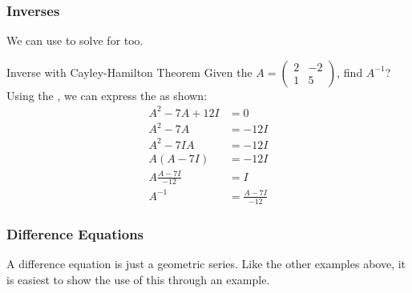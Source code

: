 \subsubsection{Inverses}\label{subsubsec:Cayley-Hamilton_Inverses}
We can use  to solve for  too.
\begin{example}{Inverse with Cayley-Hamilton Theorem}
  Given the  $A =
  \begin{pmatrix}
    2 & -2 \\
    1 & 5
  \end{pmatrix}$, find $A^{-1}$?
  Using the , we can express the  as shown:
  \begin{align*}
    A^{2} - 7A + 12I &= 0 \\
    A^{2} - 7A &= -12I \\
    A^{2} - 7IA &= -12I \\
    A (A - 7I) &= -12I \\
    A \frac{A-7I}{-12} &= I \\
    A^{-1} &= \frac{A-7I}{-12}
  \end{align*}
\end{example}

\subsubsection{Difference Equations}\label{subsubsec:Cayley-Hamilton_Difference_Equations}
A difference equation is just a geometric series.
Like the other examples above, it is easiest to show the use of this through an example.


